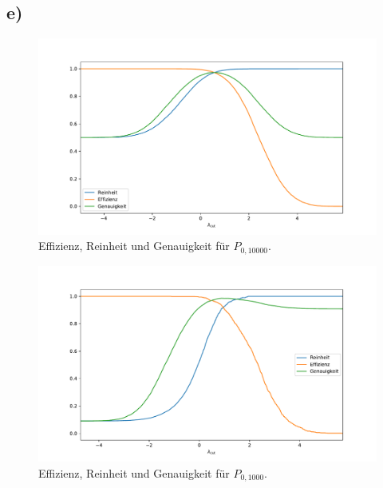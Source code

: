 \documentclass[a4paper, 11pt]{article}
\begin{document}
\subsection*{e)}
\begin{figure}
    \centering
    \includegraphics[width=\textwidth]{../A16/A16e_10000.pdf}
    \caption{Effizienz, Reinheit und Genauigkeit für $P_{0, 10000}$.}
    \label{fig:A16e_10000}
\end{figure}
\begin{figure}
    \centering
    \includegraphics[width=\textwidth]{../A16/A16e_1000.pdf}
    \caption{Effizienz, Reinheit und Genauigkeit für $P_{0, 1000}$.}
    \label{fig:A16e_1000}
\end{figure}
\FloatBarrier
\end{document}
